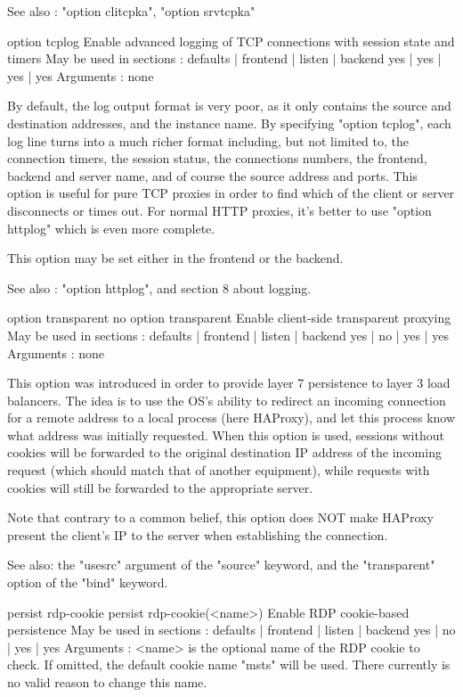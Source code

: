   See also : "option clitcpka", "option srvtcpka"


option tcplog
  Enable advanced logging of TCP connections with session state and timers
  May be used in sections :   defaults | frontend | listen | backend
                                 yes   |    yes   |   yes  |   yes
  Arguments : none

  By default, the log output format is very poor, as it only contains the
  source and destination addresses, and the instance name. By specifying
  "option tcplog", each log line turns into a much richer format including, but
  not limited to, the connection timers, the session status, the connections
  numbers, the frontend, backend and server name, and of course the source
  address and ports. This option is useful for pure TCP proxies in order to
  find which of the client or server disconnects or times out. For normal HTTP
  proxies, it's better to use "option httplog" which is even more complete.

  This option may be set either in the frontend or the backend.

  See also :  "option httplog", and section 8 about logging.


option transparent
no option transparent
  Enable client-side transparent proxying
  May be used in sections :   defaults | frontend | listen | backend
                                 yes   |    no    |   yes  |   yes
  Arguments : none

  This option was introduced in order to provide layer 7 persistence to layer 3
  load balancers. The idea is to use the OS's ability to redirect an incoming
  connection for a remote address to a local process (here HAProxy), and let
  this process know what address was initially requested. When this option is
  used, sessions without cookies will be forwarded to the original destination
  IP address of the incoming request (which should match that of another
  equipment), while requests with cookies will still be forwarded to the
  appropriate server.

  Note that contrary to a common belief, this option does NOT make HAProxy
  present the client's IP to the server when establishing the connection.

  See also: the "usesrc" argument of the "source" keyword, and the
            "transparent" option of the "bind" keyword.


persist rdp-cookie
persist rdp-cookie(<name>)
  Enable RDP cookie-based persistence
  May be used in sections :   defaults | frontend | listen | backend
                                 yes   |    no    |   yes  |   yes
  Arguments :
    <name>    is the optional name of the RDP cookie to check. If omitted, the
              default cookie name "msts" will be used. There currently is no
              valid reason to change this name.

